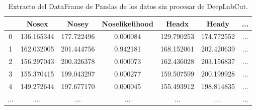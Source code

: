 \begin{table}[h]
  \centering
  \begin{tabular}{|c|c|c|c|c|c|c|}
  \hline
    & Nosex & Nosey & Noselikelihood & Headx & Heady & ... \\
  \hline
  0 & 136.165344 & 177.722496 & 0.000084 & 129.790253 & 174.772552 & ... \\
  1 & 162.032005 & 201.444756 & 0.942181 & 168.152061 & 202.420639 & ... \\
  2 & 156.297043 & 200.326378 & 0.000073 & 162.436028 & 203.156837 & ... \\
  3 & 155.370415 & 199.043297 & 0.000277 & 159.507599 & 200.199928 & ... \\
  4 & 149.272644 & 197.677170 & 0.000045 & 155.493912 & 198.814835 & ... \\
  ... & ... & ... & ... & ... & ... & ... \\
  \hline
  \end{tabular}
  \caption{Extracto del DataFrame de Pandas de los datos sin procesar de DeepLabCut.}
  \label{tab:df-example}
\end{table}

